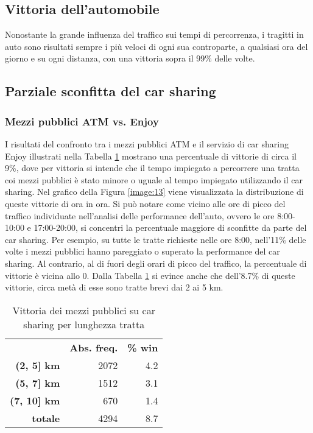 \subsection{Vittoria dell'automobile}

Nonostante la grande influenza del traffico sui tempi di percorrenza, i tragitti in auto sono risultati sempre i più veloci di ogni sua controparte, a qualsiasi ora del giorno e su ogni distanza, con una vittoria sopra il 99\% delle volte.

\subsection{Parziale sconfitta del car sharing}

\subsubsection{Mezzi pubblici ATM vs. Enjoy}

I risultati del confronto tra i mezzi pubblici ATM e il servizio di car sharing Enjoy illustrati nella Tabella \ref{table:5} mostrano una percentuale di vittorie di circa il 9\%, dove per vittoria si intende che il tempo impiegato a percorrere una tratta coi mezzi pubblici è stato minore o uguale al tempo impiegato utilizzando il car sharing. Nel grafico della Figura \ref{image:13} viene visualizzata la distribuzione di queste vittorie di ora in ora. Si può notare come vicino alle ore di picco del traffico individuate nell'analisi delle performance dell'auto, ovvero le ore 8:00-10:00 e 17:00-20:00, si concentri la percentuale maggiore di sconfitte da parte del car sharing. Per esempio, su tutte le tratte richieste nelle ore 8:00, nell'11\% delle volte i mezzi pubblici hanno pareggiato o superato la performance del car sharing. Al contrario, al di fuori degli orari di picco del traffico, la percentuale di vittorie è vicina allo 0. Dalla Tabella \ref{table:5} si evince anche che dell'8.7\% di queste vittorie, circa metà di esse sono tratte brevi dai 2 ai 5 km.

\begin{table}[H]
	\centering
	\begin{tabular}{ | r r r | }
		\hline
		& \textbf{Abs. freq.} & \textbf{\% win} \\
		\textbf{(2, 5] km} & 2072 & 4.2 \\
		\textbf{(5, 7] km} & 1512 & 3.1 \\
		\textbf{(7, 10] km} & 670 & 1.4 \\
		\hline
		\textbf{totale} & 4294 & 8.7 \\
		\hline
	\end{tabular}
	\caption{Vittoria dei mezzi pubblici su car sharing per lunghezza tratta}
	\label{table:5}
\end{table}

